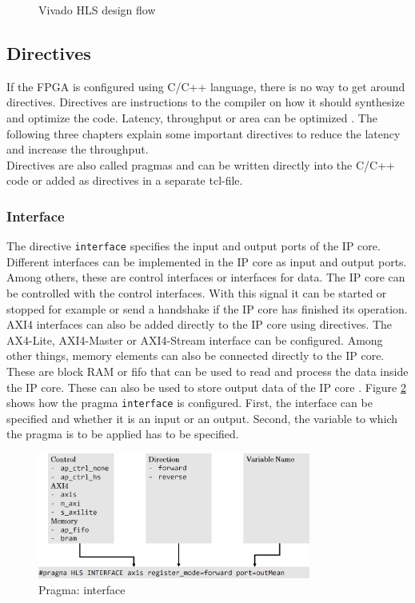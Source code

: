 \begin{figure}[tb!]
    \centering
    
    \caption{Vivado HLS design flow}
    \label{fig:hls_design_flow}
\end{figure}

\subsection{Directives} \label{ch:directives}
If the FPGA is configured using C/C++ language, there is no way to get around directives. Directives are instructions to the compiler on how it should synthesize and optimize the code. Latency, throughput or area can be optimized \cite{pragma}. The following three chapters explain some important directives to reduce the latency and increase the throughput. \\
Directives are also called pragmas and can be written directly into the C/C++ code or added as directives in a separate tcl-file.

\subsubsection*{Interface}
The directive \texttt{interface} specifies the input and output ports of the IP core. Different interfaces can be implemented in the IP core as input and output ports. Among others, these are control interfaces or interfaces for data. 
The IP core can be controlled with the control interfaces. With this signal it
can be started or stopped for example or send a handshake if the IP core has
finished its operation. 
AXI4 interfaces can also be added directly to the IP core using directives. The
AX4-Lite, AXI4-Master or AXI4-Stream interface can be configured.
Among other things, memory elements can also be connected directly to the IP
core. These are block RAM or \gls{fifo} that can be used to read and process
the data
inside the IP core. These can also be used to store output data of the IP core 
\cite{pragma}.
\clearpage
Figure \ref{fig:p_interface} shows how the pragma \texttt{interface} is
configured. First, the interface can be specified and whether it is an input or
an output. Second, the variable to which the pragma is to be applied has to be
specified.

\begin{figure}[tb!]
    \centering
    \includegraphics[width=0.8\textwidth]{images/theory/interface.png}
    \caption{Pragma: interface}
    \label{fig:p_interface}
\end{figure}

